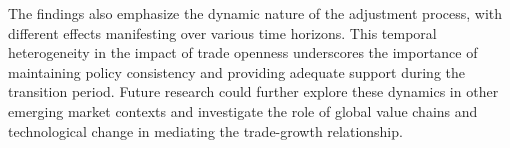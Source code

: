 \documentclass[12pt,a4paper]{article}
\theoremstyle{definition}
\begin{document}
The findings also emphasize the dynamic nature of the adjustment process, with different effects manifesting over various time horizons. This temporal heterogeneity in the impact of trade openness underscores the importance of maintaining policy consistency and providing adequate support during the transition period. Future research could further explore these dynamics in other emerging market contexts and investigate the role of global value chains and technological change in mediating the trade-growth relationship.
\end{document}
